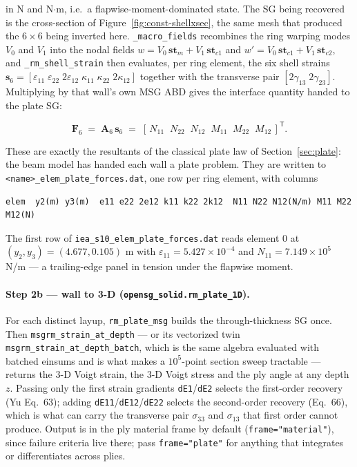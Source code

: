 
in N and N$\cdot$m, i.e.\ a flapwise-moment-dominated state. The SG being
recovered is the cross-section of Figure~\ref{fig:const-shellxsec}, the same
mesh that produced the $6\times6$ being inverted here.
\texttt{\_macro\_fields} recombines the ring warping modes $V_0$ and
$V_1$ into the nodal fields $w = V_0\,\mathbf{st}_m + V_1\,\mathbf{st}_{c1}$ and
$w' = V_0\,\mathbf{st}_{c1} + V_1\,\mathbf{st}_{c2}$, and
\texttt{\_rm\_shell\_strain} then evaluates, per ring element, the six shell
strains
$\mathbf s_6 = [\varepsilon_{11}\;\varepsilon_{22}\;2\varepsilon_{12}\;
\kappa_{11}\;\kappa_{22}\;2\kappa_{12}]$ together with the transverse pair
$[2\gamma_{13}\;2\gamma_{23}]$. Multiplying by that wall's own MSG ABD gives
the interface quantity handed to the plate SG:

\begin{equation}
\mathbf F_6 \;=\; \mathbf A_6\,\mathbf s_6
\;=\; [\,N_{11}\;\;N_{22}\;\;N_{12}\;\;M_{11}\;\;M_{22}\;\;M_{12}\,]^{\mathsf T}.
\label{eq:f6}
\end{equation}

These are exactly the resultants of the classical plate law of
Section~\ref{sec:plate}: the beam model has handed each wall a plate problem.
They are written to \texttt{<name>\_elem\_plate\_forces.dat}, one row per ring
element, with columns

\begin{Verbatim}[fontsize=\footnotesize,frame=single]
elem  y2(m) y3(m)  e11 e22 2e12 k11 k22 2k12  N11 N22 N12(N/m) M11 M22 M12(N)
\end{Verbatim}

The first row of \texttt{iea\_s10\_elem\_plate\_forces.dat} reads element 0 at
$(y_2, y_3) = (4.677, 0.105)$ m with $\varepsilon_{11} = 5.427\times10^{-4}$ and
$N_{11} = 7.149\times10^{5}$ N/m --- a trailing-edge panel in tension under the
flapwise moment.

\paragraph{Step 2b --- wall to 3-D (\texttt{opensg\_solid.rm\_plate\_1D}).}
For each distinct layup, \texttt{rm\_plate\_msg} builds the through-thickness SG
once. Then \texttt{msgrm\_strain\_at\_depth} --- or
its vectorized twin \texttt{msgrm\_strain\_at\_depth\_batch}, which is the same
algebra evaluated with batched einsums and is what makes a $10^5$-point section
sweep tractable --- returns the 3-D Voigt strain, the 3-D Voigt stress and the
ply angle at any depth $z$. Passing only the first strain gradients
\texttt{dE1}/\texttt{dE2} selects the first-order recovery (Yu Eq.~63); adding
\texttt{dE11}/\texttt{dE12}/\texttt{dE22} selects the second-order recovery
(Eq.~66), which is what can carry the transverse pair $\sigma_{33}$ and
$\sigma_{13}$ that first order cannot produce. Output is in the ply material
frame by default (\texttt{frame="material"}), since failure criteria live
there; pass \texttt{frame="plate"} for anything that integrates or
differentiates across plies.

